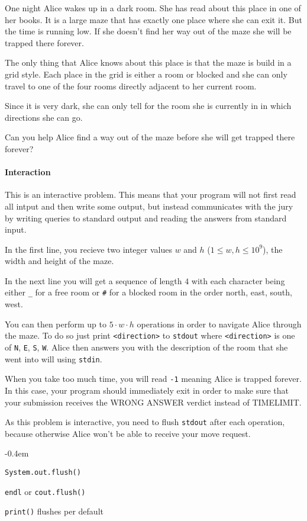 



\makeheader

One night Alice wakes up in a dark room. She has read about this place in one of her books. It is a large maze that has exactly one place where she can exit it. But the time is running low. If she doesn't find her way out of the maze she will be trapped there forever.

The only thing that Alice knows about this place is that the maze is build in a grid style. Each place in the grid is either a room or blocked and she can only travel to one of the four rooms directly adjacent to her current room.

Since it is very dark, she can only tell for the room she is currently in in which directions she can go.

Can you help Alice find a way out of the maze before she will get trapped there forever?

\paragraph*{Interaction}

This is an interactive problem. This means that your program will not first
read all intput and then write some output, but instead communicates with
the jury by writing queries to standard output and reading the answers from
standard input.

In the first line, you recieve two integer values $w$ and $h$ ($1\leq w, h \leq 10^9$), the width and height of the maze.

In the next line you will get a sequence of length $4$ with each character being either \texttt{_} for a free room or \texttt{#} for a blocked room in the order north, east, south, west.

You can then perform up to $5 \cdot w \cdot h$ operations in order to navigate Alice through the maze. To do so just print \texttt{<direction>} to \texttt{stdout} where \texttt{<direction>} is one of \texttt{N}, \texttt{E}, \texttt{S}, \texttt{W}. Alice then answers you with the description of the room that she went into will using \texttt{stdin}. 

When you take too much time, you will read \texttt{-1} meaning Alice is trapped forever. In this case, your program should immediately exit in order to make sure that your submission receives the WRONG ANSWER verdict instead of TIMELIMIT.

As this problem is interactive, you need to flush \texttt{stdout} after each operation, because otherwise Alice won't be able to receive your move request.
\begin{description}
	\itemsep-0.4em
	\item[Java:] \texttt{System.out.flush()}
	\item[C++:] \texttt{endl} or \texttt{cout.flush()}
  \item[Python] \texttt{print()} flushes per default
\end{description}

